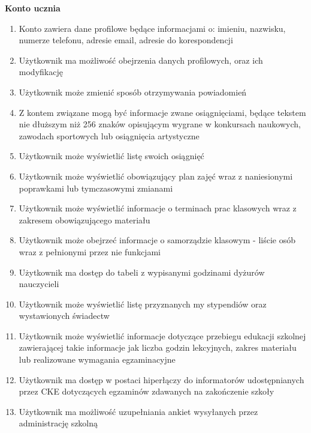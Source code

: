 \documentclass{article}
\begin{document}
\textbf{Konto ucznia}
\begin{enumerate}
	\item Konto zawiera dane profilowe będące informacjami o: imieniu, nazwisku, numerze telefonu, adresie email, adresie do korespondencji
	\item Użytkownik ma możliwość obejrzenia danych profilowych, oraz ich modyfikację
	\item Użytkownik może zmienić sposób otrzymywania powiadomień
	\item Z kontem związane mogą być informacje zwane osiągnięciami, będące tekstem nie dłuższym niż 256 znaków opisującym wygrane w konkursach naukowych, zawodach sportowych lub osiągnięcia artystyczne
	\item Użytkownik może wyświetlić listę swoich osiągnięć
	\item Użytkownik może wyświetlić obowiązujący plan zajęć wraz z naniesionymi poprawkami lub tymczasowymi zmianami
	\item Użytkownik może wyświetlić informacje o terminach prac klasowych wraz z zakresem obowiązującego materiału
	\item Użytkownik może obejrzeć informacje o samorządzie klasowym - liście osób wraz z pełnionymi przez nie funkcjami
	\item Użytkownik ma dostęp do tabeli z wypisanymi godzinami dyżurów nauczycieli
	\item Użytkownik może wyświetlić listę przyznanych my stypendiów oraz wystawionych świadectw
	\item Użytkownik może wyświetlić informacje dotyczące przebiegu edukacji szkolnej zawierającej takie informacje jak liczba godzin lekcyjnych, zakres materiału lub realizowane wymagania egzaminacyjne
	\item Użytkownik ma dostęp w postaci hiperłączy do informatorów udostępnianych przez CKE dotyczących egzaminów zdawanych na zakończenie szkoły
	\item Użytkownik ma możliwość uzupełniania ankiet wysyłanych przez administrację szkolną
	
\end{enumerate}
\end{document}

